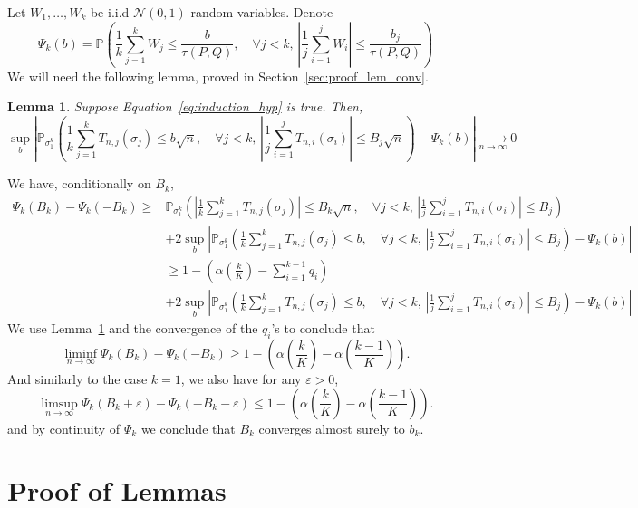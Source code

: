 \documentclass{article}
\theoremstyle{plain}
\newtheorem{Lemma}{Lemma}
\theoremstyle{remark}
\renewcommand{\P}{\mathbb{P}}
\newcommand{\1}{\mathbbm{1}}
\newcommand{\todoT}[1]{\todo[inline,color=blue!30]{{\textbf{T:}~}#1}}
\numberwithin{equation}{section}
\begin{document}
Let $W_1,\dots,W_k$ be i.i.d $\mathcal{N}(0,1)$ random variables. Denote
$$\Psi_k(b) = \P\left( \frac{1}{k}\sum_{j=1}^k W_j \le \frac{b}{\tau(P,Q)}, \quad \forall j<k,\, \left|\frac{1}{j}\sum_{i=1}^j W_i\right| \le \frac{b_j}{\tau(P,Q)} \right) $$
We will need the following lemma, proved in Section~\ref{sec:proof_lem_conv}.
\begin{Lemma}\label{lem:convergence_conditional}
Suppose Equation~\eqref{eq:induction_hyp} is true. Then,
$$\sup_{b}\left|\P_{\sigma_1^{k}}\left(\frac{1}{k}\sum_{j=1}^k T_{n,j}\left(\sigma_j\right)\le b \sqrt{n}, \quad \forall j < k,\,  \left|\frac{1}{j}\sum_{i=1}^j T_{n,i}\left(\sigma_i\right)\right|\le  B_j\sqrt{n} \right)-\Psi_k(b) \right|\xrightarrow[n \to \infty]{}0$$
\end{Lemma}
We have, conditionally on $B_k$,
\begin{align*}
\Psi_k(B_k)-\Psi_k(-B_k)\ge&  \P_{\sigma_1^{k}}\left(\left|\frac{1}{k}\sum_{j=1}^k T_{n,j}\left(\sigma_j\right)\right|\le B_k \sqrt{n}, \quad \forall j < k,\,  \left|\frac{1}{j}\sum_{i=1}^j T_{n,i}\left(\sigma_i\right)\right|\le  B_j \right)\\
&+ 2 \sup_{b}\left|\P_{\sigma_1^{k}}\left(\frac{1}{k}\sum_{j=1}^k T_{n,j}\left(\sigma_j\right)\le b , \quad \forall j < k,\,  \left|\frac{1}{j}\sum_{i=1}^j T_{n,i}\left(\sigma_i\right)\right|\le  B_j \right)-\Psi_k(b) \right|\\
&\ge 1-\left(\alpha\left( \frac{k}{K}\right)-\sum_{i=1}^{k-1}q_i\right) \\
&+ 2 \sup_{b}\left|\P_{\sigma_1^{k}}\left(\frac{1}{k}\sum_{j=1}^k T_{n,j}\left(\sigma_j\right)\le b , \quad \forall j < k,\,  \left|\frac{1}{j}\sum_{i=1}^j T_{n,i}\left(\sigma_i\right)\right|\le  B_j \right)-\Psi_k(b) \right|
\end{align*}
We use Lemma~\ref{lem:convergence_conditional} and the convergence of the $q_i$'s to conclude that
$$\liminf_{n \to \infty}\Psi_k(B_k)-\Psi_k(-B_k) \ge 1-\left(\alpha\left( \frac{k}{K}\right)-\alpha\left( \frac{k-1}{K}\right)\right).$$
And similarly to the case $k=1$, we also have for any $\varepsilon>0$,
$$\limsup_{n \to \infty}\Psi_k(B_k+\varepsilon)-\Psi_k(-B_k-\varepsilon) \le  1-\left(\alpha\left( \frac{k}{K}\right)-\alpha\left( \frac{k-1}{K}\right)\right).$$
and by continuity of $\Psi_k$ we conclude that $B_k$ converges almost surely to $b_k$.
\todoT{Check continuity of $\Psi_k$}
\section{Proof of Lemmas}
\end{document}
